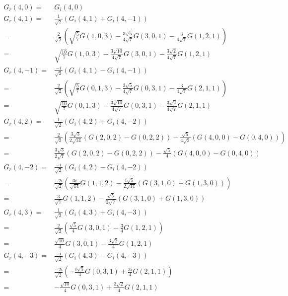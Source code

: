 \documentclass[a4paper,12pt]{article}
\begin{document}
\begin{equation}
	\begin{split}
		G_r(4,0) = & G_i(4,0)\\
		G_r(4,1) = &\frac{1}{\sqrt{2}}\left(G_i(4,1)+G_i(4,-1)\right)\\
		         = &\frac{2}{\sqrt{2}}\left(\sqrt{\frac{5}{7}}G(1,0,3)-\frac{3\sqrt{5}}{4\sqrt{7}}G(3,0,1)-\frac{3}{4\sqrt{7}}G(1,2,1)\right)\\
				 = &\sqrt{\frac{10}{7}}G(1,0,3)-\frac{3\sqrt{10}}{4\sqrt{7}}G(3,0,1)-\frac{3\sqrt{2}}{4\sqrt{7}}G(1,2,1)\\
		G_r(4,-1) = &\frac{-i}{\sqrt{2}}\left(G_i(4,1)-G_i(4,-1)\right)\\
		         = &\frac{2}{\sqrt{2}}\left(\sqrt{\frac{5}{7}}G(0,1,3)-\frac{3\sqrt{5}}{4\sqrt{7}}G(0,3,1)-\frac{3}{4\sqrt{7}}G(2,1,1)\right)\\
				 = &\sqrt{\frac{10}{7}}G(0,1,3)-\frac{3\sqrt{10}}{4\sqrt{7}}G(0,3,1)-\frac{3\sqrt{2}}{4\sqrt{7}}G(2,1,1)\\
		G_r(4,2) = &\frac{1}{\sqrt{2}}\left(G_i(4,2)+G_i(4,-2)\right)\\
		         = &\frac{2}{\sqrt{2}}\left(\frac{3\sqrt{3}}{2\sqrt{14}}(G(2,0,2)-G(0,2,2))-\frac{\sqrt{5}}{4\sqrt{2}}(G(4,0,0)-G(0,4,0))\right)\\
		         = &\frac{3\sqrt{3}}{2\sqrt{7}}(G(2,0,2)-G(0,2,2))-\frac{\sqrt{5}}{4}(G(4,0,0)-G(0,4,0))\\
		G_r(4,-2) = &\frac{-i}{\sqrt{2}}\left(G_i(4,2)-G_i(4,-2)\right)\\
		         =&\frac{-2i}{\sqrt{2}}\left(\frac{3i}{\sqrt{14}}G(1,1,2)-\frac{i\sqrt{5}}{2\sqrt{14}}(G(3,1,0)+G(1,3,0))\right)\\
		         =&\frac{3}{\sqrt{7}}G(1,1,2)-\frac{\sqrt{5}}{2\sqrt{7}}(G(3,1,0)+G(1,3,0))\\
		G_r(4,3) = &\frac{1}{\sqrt{2}}\left(G_i(4,3)+G_i(4,-3)\right)\\
		         = &\frac{2}{\sqrt{2}}\left(\frac{\sqrt{5}}{4}G(3,0,1)-\frac{3}{4}G(1,2,1)\right)\\
				 = &\frac{\sqrt{10}}{4}G(3,0,1)-\frac{3\sqrt{2}}{4}G(1,2,1)\\
		G_r(4,-3) = &\frac{-i}{\sqrt{2}}\left(G_i(4,3)-G_i(4,-3)\right)\\
		        = &\frac{-2i}{\sqrt{2}}\left(-\frac{i\sqrt{5}}{4}G(0,3,1)+\frac{3i}{4}G(2,1,1)\right)\\
				= &-\frac{\sqrt{10}}{4}G(0,3,1)+\frac{3\sqrt{2}}{4}G(2,1,1)\\
	\end{split}
\end{equation}
\end{document}
